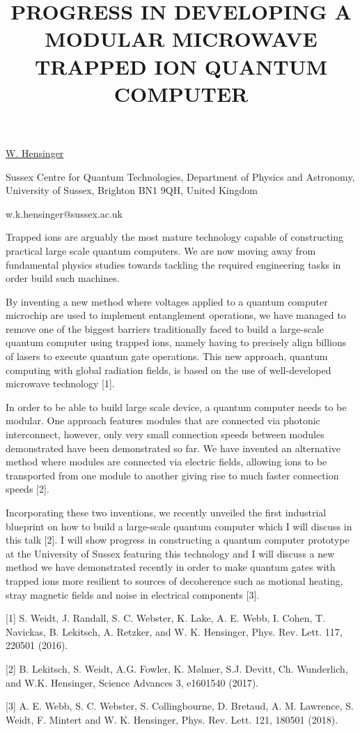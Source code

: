 \title{PROGRESS IN DEVELOPING A MODULAR MICROWAVE TRAPPED ION QUANTUM COMPUTER}

\underline{W. Hensinger}  

{\normalsize{\vspace{-4mm}
Sussex Centre for Quantum Technologies, Department of Physics and Astronomy, University of Sussex, Brighton BN1 9QH, United Kingdom



\email w.k.hensinger@sussex.ac.uk}}

Trapped ions are arguably the most mature technology capable of constructing practical large scale quantum computers. We are now moving away from fundamental physics studies towards tackling the required engineering tasks in order build such machines. 

By inventing a new method where voltages applied to a quantum computer microchip are used to implement entanglement operations, we have managed to remove one of the biggest barriers traditionally faced to build a large-scale quantum computer using trapped ions, namely having to precisely align billions of lasers to execute quantum gate operations. This new approach, quantum computing with global radiation fields, is based on the use of well-developed microwave technology [1].

In order to be able to build large scale device, a quantum computer needs to be modular. One approach features modules that are connected via photonic interconnect, however, only very small connection speeds between modules demonstrated have been demonstrated so far.  We have invented an alternative method where modules are connected via electric fields, allowing ions to be transported from one module to another giving rise to much faster connection speeds [2].

Incorporating these two inventions, we recently unveiled the first industrial blueprint on how to build a large-scale quantum computer which I will discuss in this talk [2]. I will show progress in constructing a quantum computer prototype at the University of Sussex featuring this technology and I will discuss a new method we have demonstrated recently in order to make quantum gates with trapped ions more resilient to sources of decoherence such as motional heating, stray magnetic fields and noise in electrical components [3].

{\normalsize
[1] S. Weidt, J. Randall, S. C. Webster, K. Lake, A. E. Webb, I. Cohen, T. Navickas, B. Lekitsch, A. Retzker, and W. K. Hensinger, Phys. Rev. Lett. 117, 220501 (2016).
\vsp
 
[2] B. Lekitsch, S. Weidt, A.G. Fowler, K. Mølmer, S.J. Devitt, Ch. Wunderlich, and W.K. Hensinger, Science Advances 3, e1601540 (2017).
\vsp

[3] A. E. Webb, S. C. Webster, S. Collingbourne, D. Bretaud, A. M. Lawrence, S. Weidt, F. Mintert and W. K. Hensinger, Phys. Rev. Lett. 121, 180501 (2018).
}

\vspace{\baselineskip}